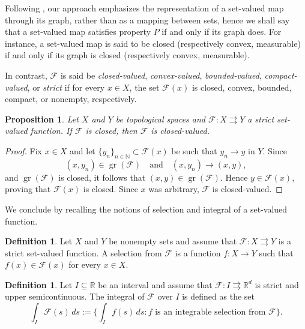 \documentclass[11pt]{elsarticle}
\newtheorem{proposition}[theorem]{Proposition}
\theoremstyle{definition}
\newtheorem{definition}[theorem]{Definition}
\theoremstyle{remark}
\numberwithin{equation}{section}
\def\gr{\operatorname{gr}}
\begin{document}
	
	Following \cite{aubin_frankowska_2009}, our approach emphasizes the representation of a set-valued map through its graph, rather than as a mapping between sets, hence we shall say that a set-valued map satisfies property $P$ if and only if its graph does.
	For instance, a set-valued map is said to be closed (respectively convex, measurable) if and only if its graph is closed (respectively convex, measurable).
	
	
	
	In contrast, $\mathcal{F}$ is said be \emph{closed-valued}, \emph{convex-valued}, \emph{bounded-valued}, \emph{compact-valued}, or \emph{strict} if for every $x\in X$, the set \(\mathcal{F}(x)\) is closed, convex, bounded, compact, or nonempty, respectively.
	
	\begin{proposition}
		Let $X$ and $Y$ be topological spaces and $\mathcal{F}:X\rightrightarrows Y$ a strict set-valued function. If $\mathcal{F}$ is closed, then $\mathcal{F}$ is closed-valued.
	\end{proposition}
	
	\begin{proof}
		Fix $x\in X$ and let $\{y_n\}_{n\in\mathbb{N}}\subset \mathcal{F}(x)$ be such that $y_n\to y$ in $Y$. Since
		\[
		(x,y_n)\in \gr(\mathcal{F})
		\quad\text{and}\quad
		(x,y_n)\to (x,y),
		\]
		and $\gr(\mathcal{F})$ is closed, it follows that $(x,y)\in \gr(\mathcal{F})$. Hence $y\in \mathcal{F}(x)$, proving that $\mathcal{F}(x)$ is closed. Since $x$ was arbitrary, $\mathcal{F}$ is closed-valued.
	\end{proof}
	
	
	
	
	We conclude by recalling the notions of selection and integral of a set-valued function.
	
	\begin{definition}
		Let $X$ and $Y$ be nonempty sets and
		assume that $\mathcal{F}:X\rightrightarrows Y$ is a strict set-valued function.
		A selection from $\mathcal{F}$ is a function $f:X \to Y$
		such that $f(x)\in\mathcal{F}(x)$ for every $x\in X$.
	\end{definition}
	
	\begin{definition}
		Let $I\subseteq\mathbb{R}$ be an interval and
		assume that  $\mathcal{F}:I\rightrightarrows \mathbb{R}^d$ is strict and upper semicontinuous. The integral of $\mathcal{F}$ over $I$ is defined as the set
		\[
		\int_I \mathcal{F}(s) \, ds := \Big\{ \int_I f(s)\,ds : f \text{ is an integrable selection from } \mathcal{F} \Big\}.
		\]
	\end{definition}
	
\end{document}
